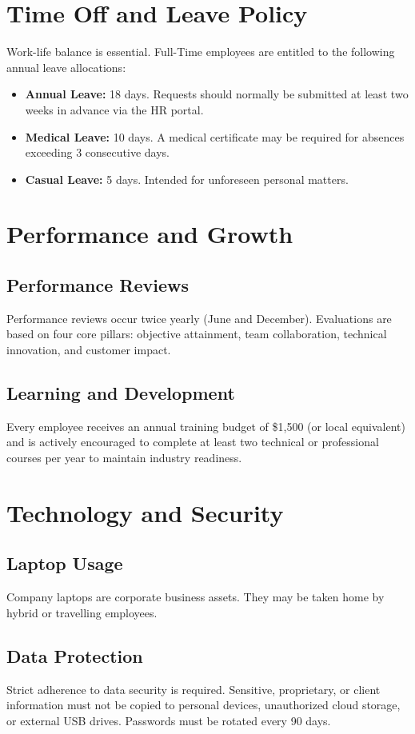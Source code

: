 \documentclass[11pt, a4paper]{article}
\begin{document}
\section{Time Off and Leave Policy}
Work-life balance is essential. Full-Time employees are entitled to the following annual leave allocations:
\begin{itemize}[label=\textcolor{primary}{\textbullet}]
    \item \textbf{Annual Leave:} 18 days. Requests should normally be submitted at least two weeks in advance via the HR portal.
    \item \textbf{Medical Leave:} 10 days. A medical certificate may be required for absences exceeding 3 consecutive days.
    \item \textbf{Casual Leave:} 5 days. Intended for unforeseen personal matters.
\end{itemize}

\section{Performance and Growth}
\subsection{Performance Reviews}
Performance reviews occur twice yearly (June and December). Evaluations are based on four core pillars: objective attainment, team collaboration, technical innovation, and customer impact.
\subsection{Learning and Development}
Every employee receives an annual training budget of \$1,500 (or local equivalent) and is actively encouraged to complete at least two technical or professional courses per year to maintain industry readiness.

\section{Technology and Security}
\subsection{Laptop Usage}
Company laptops are corporate business assets. They may be taken home by hybrid or travelling employees. 
\subsection{Data Protection}
Strict adherence to data security is required. Sensitive, proprietary, or client information must not be copied to personal devices, unauthorized cloud storage, or external USB drives. Passwords must be rotated every 90 days.
\end{document}
